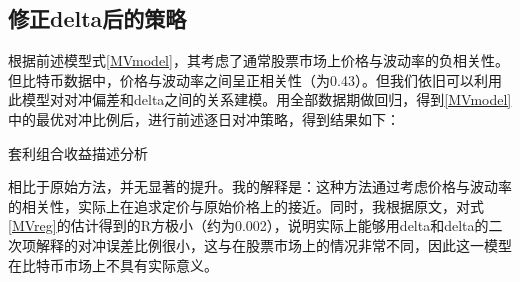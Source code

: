 \subsection{修正delta后的策略}
根据前述模型式\ref{MVmodel}，其考虑了通常股票市场上价格与波动率的负相关性。但比特币数据中，价格与波动率之间呈正相关性（为0.43）。但我们依旧可以利用此模型对对冲偏差和delta之间的关系建模。用全部数据期做回归，得到\ref{MVmodel}中的最优对冲比例后，进行前述逐日对冲策略，得到结果如下：
\begin{table}[H]
    \caption{套利组合收益描述分析}
    \centering
    
    
\end{table}
相比于原始方法，并无显著的提升。我的解释是：这种方法通过考虑价格与波动率的相关性，实际上在追求定价与原始价格上的接近。同时，我根据原文，对式\ref{MVreg}的估计得到的R方极小（约为0.002），说明实际上能够用delta和delta的二次项解释的对冲误差比例很小，这与在股票市场上的情况非常不同，因此这一模型在比特币市场上不具有实际意义。
